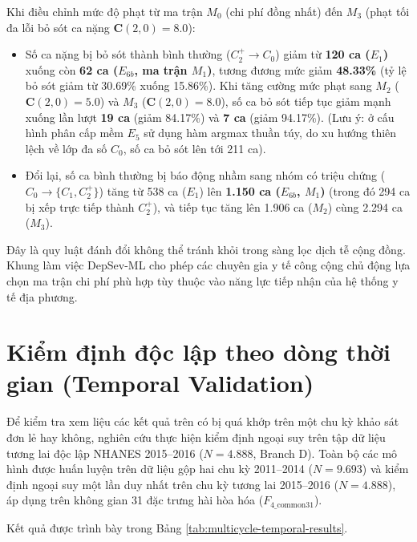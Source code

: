 Khi điều chỉnh mức độ phạt từ ma trận $M_0$ (chi phí đồng nhất) đến $M_3$ (phạt tối đa lỗi bỏ sót ca nặng $\mathbf{C}(2, 0) = 8.0$):
\begin{itemize}
    \item Số ca nặng bị bỏ sót thành bình thường ($C_2^+ \to C_0$) giảm từ \textbf{120 ca ($E_1$)} xuống còn \textbf{62 ca ($E_{6b}$, ma trận $M_1$)}, tương đương mức giảm \textbf{48.33\%} (tỷ lệ bỏ sót giảm từ 30.69\% xuống 15.86\%). Khi tăng cường mức phạt sang $M_2$ ($\mathbf{C}(2, 0) = 5.0$) và $M_3$ ($\mathbf{C}(2, 0) = 8.0$), số ca bỏ sót tiếp tục giảm mạnh xuống lần lượt \textbf{19 ca} (giảm 84.17\%) và \textbf{7 ca} (giảm 94.17\%). (Lưu ý: ở cấu hình phân cấp mềm $E_5$ sử dụng hàm argmax thuần túy, do xu hướng thiên lệch về lớp đa số $C_0$, số ca bỏ sót lên tới 211 ca).
    \item Đổi lại, số ca bình thường bị báo động nhầm sang nhóm có triệu chứng ($C_0 \to \{C_1, C_2^+\}$) tăng từ 538 ca ($E_1$) lên \textbf{1.150 ca ($E_{6b}$, $M_1$)} (trong đó 294 ca bị xếp trực tiếp thành $C_2^+$), và tiếp tục tăng lên 1.906 ca ($M_2$) cùng 2.294 ca ($M_3$).
\end{itemize}
Đây là quy luật đánh đổi không thể tránh khỏi trong sàng lọc dịch tễ cộng đồng. Khung làm việc DepSev-ML cho phép các chuyên gia y tế công cộng chủ động lựa chọn ma trận chi phí phù hợp tùy thuộc vào năng lực tiếp nhận của hệ thống y tế địa phương.

\section{Kiểm định độc lập theo dòng thời gian (Temporal Validation)}
\label{sec:temporal-results}

Để kiểm tra xem liệu các kết quả trên có bị quá khớp trên một chu kỳ khảo sát đơn lẻ hay không, nghiên cứu thực hiện kiểm định ngoại suy trên tập dữ liệu tương lai độc lập NHANES 2015--2016 ($N = 4.888$, Branch D). Toàn bộ các mô hình được huấn luyện trên dữ liệu gộp hai chu kỳ 2011--2014 ($N = 9.693$) và kiểm định ngoại suy một lần duy nhất trên chu kỳ tương lai 2015--2016 ($N = 4.888$), áp dụng trên không gian 31 đặc trưng hài hòa hóa ($F_{4\_\text{common31}}$).

Kết quả được trình bày trong Bảng \ref{tab:multicycle-temporal-results}.



